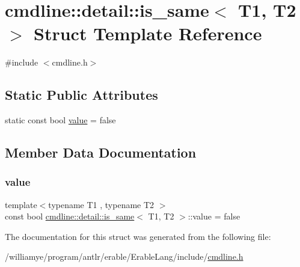 \hypertarget{structcmdline_1_1detail_1_1is__same}{}\section{cmdline\+::detail\+::is\+\_\+same$<$ T1, T2 $>$ Struct Template Reference}
\label{structcmdline_1_1detail_1_1is__same}


{\ttfamily \#include $<$cmdline.\+h$>$}

\subsection*{Static Public Attributes}
\begin{DoxyCompactItemize}
\item 
static const bool \mbox{\hyperlink{structcmdline_1_1detail_1_1is__same_aee0ed17263370d2446766f79c85c0f43}{value}} = false
\end{DoxyCompactItemize}


\subsection{Member Data Documentation}
\mbox{\label{structcmdline_1_1detail_1_1is__same_aee0ed17263370d2446766f79c85c0f43}} 
\subsubsection{\texorpdfstring{value}{value}}
{\footnotesize\ttfamily template$<$typename T1 , typename T2 $>$ \\
const bool \mbox{\hyperlink{structcmdline_1_1detail_1_1is__same}{cmdline\+::detail\+::is\+\_\+same}}$<$ T1, T2 $>$\+::value = false\hspace{0.3cm}{\ttfamily [static]}}



The documentation for this struct was generated from the following file\+:\begin{DoxyCompactItemize}
\item 
/williamye/program/antlr/erable/\+Erable\+Lang/include/\mbox{\hyperlink{cmdline_8h}{cmdline.\+h}}\end{DoxyCompactItemize}
